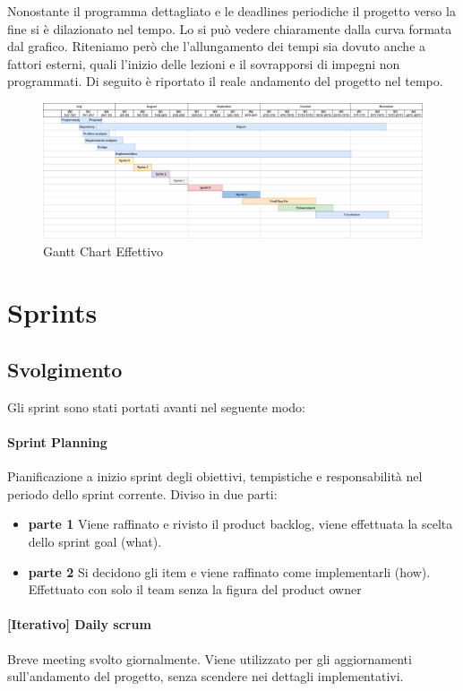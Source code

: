 Nonostante il programma dettagliato e le deadlines periodiche il progetto verso la fine si è dilazionato nel tempo. Lo si può vedere chiaramente dalla curva formata dal grafico. Riteniamo però che l'allungamento dei tempi sia dovuto anche a fattori esterni, quali l'inizio delle lezioni e il sovrapporsi di impegni non programmati. Di seguito è riportato il reale andamento del progetto nel tempo. 
\begin{figure}[H]
    \caption{Gantt Chart Effettivo}
    \label{fig:GanttReal}
    \centering
    \includegraphics[width=1\textwidth]{DrawIo/GanttChartReal.png}
\end{figure}

\section{Sprints}

\subsection{Svolgimento}
Gli sprint sono stati portati avanti nel seguente modo:
    \paragraph{Sprint Planning}
        Pianificazione a inizio sprint degli obiettivi, tempistiche e responsabilità nel periodo dello sprint corrente. Diviso in due parti:
        \begin{itemize}
        \item\textbf{parte 1} 
            Viene raffinato e rivisto il product backlog, viene effettuata la scelta dello sprint goal (what).
        \item\textbf{parte 2}
            Si decidono gli item e viene raffinato come implementarli (how). Effettuato con solo il team senza la figura del product owner
        \end{itemize}
    \paragraph{[Iterativo] Daily scrum} Breve meeting svolto giornalmente. Viene utilizzato per gli aggiornamenti sull'andamento del progetto, senza scendere nei dettagli implementativi.
